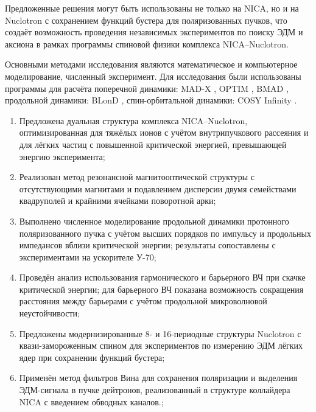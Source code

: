 \par Предложенные решения могут быть использованы не только на NICA, но и на Nuclotron с сохранением функций бустера для поляризованных пучков, что создаёт возможность проведения независимых экспериментов по поиску ЭДМ и аксиона в рамках программы спиновой физики комплекса NICA–Nuclotron.


\par {\methods} Основными методами исследования являются математическое и компьютерное моделирование, численный эксперимент. Для исследования были использованы программы для расчёта поперечной динамики: MAD-X \autocite{madx}, OPTIM \autocite{optim}, BMAD \autocite{bmad}, продольной динамики: BLonD \autocite{blond}, спин-орбитальной динамики: COSY Infinity \autocite{cosy}.
~\\

\par {}
\begin{enumerate}[beginpenalty=10000] %
	\item 	Предложена дуальная структура комплекса NICA–Nuclotron, оптимизированная для тяжёлых ионов с учётом внутрипучкового рассеяния и для лёгких частиц с повышенной критической энергией, превышающей энергию эксперимента; \autocite{Kolokolchikov:2025_dual, Syresin:2021_polar}
	\item	Реализован метод резонансной магнитооптической структуры с отсутствующими магнитами и подавлением дисперсии двумя семействами квадруполей и крайними ячейками поворотной арки; \autocite{Kolokolchikov:2021trans, Kolokolchikov:2023_pecular}
	\item	Выполнено численное моделирование продольной динамики протонного поляризованного пучка с учётом высших порядков по импульсу и продольных импедансов вблизи критической энергии; результаты сопоставлены с экспериментами на ускорителе У-70; \autocite{Kolokolchikov:2025_U70, Kolokolchikov:2025_jump}
	\item 	Проведён анализ использования гармонического и барьерного ВЧ при скачке критической энергии; для барьерного ВЧ показана возможность сокращения расстояния между барьерами с учётом продольной микроволновой неустойчивости; \autocite{Kolokolchikov:2024_bb_rupac, Kolokolchikov:2023_bb_IPAC, Kolokolchikov:2024_bb_dspin}
	\item	Предложены модернизированные 8- и 16-периодные структуры Nuclotron с квази-замороженным спином для экспериментов по измерению ЭДМ лёгких ядер при сохранении функций бустера; \autocite{Senichev:2023_QFS, Senichev:2023_nuclotron, Kolokolchikov:2025_nuclotron}
	\item	Применён метод фильтров Вина для сохранения поляризации и выделения ЭДМ-сигнала в пучке дейтронов, реализованный в структуре коллайдера NICA с введением обводных каналов.; \autocite{Kolokolchikov:2023_bypass_ru, Kolokolchikov:2023_bypass_IPAC, Senichev:2024_nica_edm, Kolokolchikov:2023_sc, Kolokolchikov:2023_sc_IPAC}
\end{enumerate}


